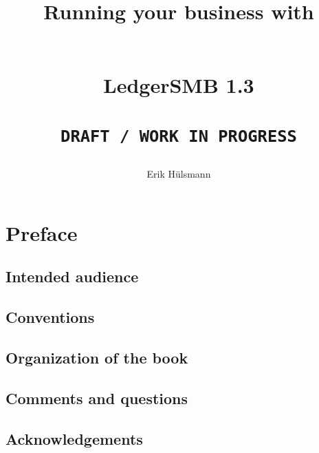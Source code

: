 \documentclass[10pt,A4]{book}
\begin{document}
\author{Erik H\"ulsmann}
\title{\begin{Large}
Running your business with
\end{Large} \\
LedgerSMB 1.3 \\
 ~ \\
\texttt{DRAFT / WORK IN PROGRESS} }


\maketitle


\tableofcontents



\chapter*{Preface}

\section{Intended audience}
\section{Conventions}
\section{Organization of the book}
\section{Comments and questions}
\section{Acknowledgements}








\end{document}
